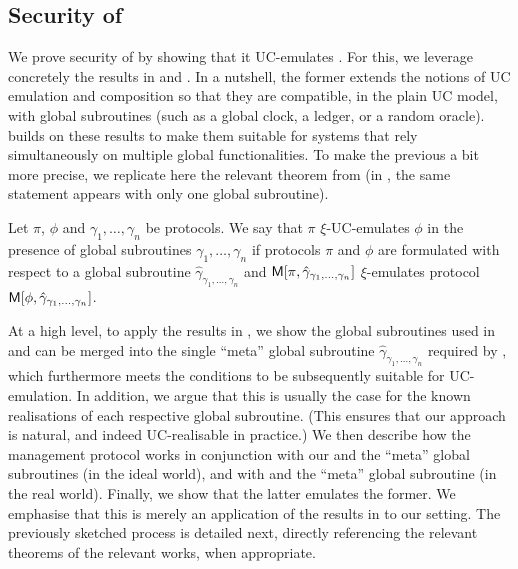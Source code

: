 \subsection{Security of \RealPKIDIDAtala}
\label{ssec:sec-didatala}

We prove security of \RealPKIDIDAtala by showing that it UC-emulates
\IdealGPKIDID. For this, we leverage concretely the results in \cite{bch+20} and
\cite{bhz21}. In a nutshell, the former extends the notions of UC emulation and
composition so that they are compatible, in the plain UC model, with global
subroutines (such as a global clock, a ledger, or a random oracle).
\cite{bhz21} builds on these results to make them suitable for systems that rely
simultaneously on multiple global functionalities.
%
To make the previous a bit more precise, we replicate here the relevant theorem
from \cite{bhz21} (in \cite{bch+20}, the same statement appears with only one
global subroutine).

\begin{theorem}
  \label{thm:uc-bhz21}
  Let $\pi$, $\phi$ and $\gamma_1,\dots,\gamma_n$ be protocols. We say that
  $\pi$ $\xi$-UC-emulates $\phi$ in the presence of global subroutines
  $\gamma_1,\dots,\gamma_n$ if protocols $\pi$ and $\phi$ are formulated with
  respect to a global subroutine $\hat{\gamma}_{\gamma_1,\dots,\gamma_n}$ and
  $\mathsf{M}[\pi,\hat{\gamma}_{\gamma_1,\dots,\gamma_n}]$ $\xi$-emulates protocol
  $\mathsf{M}[\phi,\hat{\gamma}_{\gamma_1,\dots,\gamma_n}]$.
\end{theorem}

At a high level, to apply the results in \cite{bch+20,bzh21}, we show the global
subroutines used in \IdealGPKIDID and \RealPKIDIDAtala can be merged into the
single ``meta'' global subroutine $\hat{\gamma}_{\gamma_1,\dots,\gamma_n}$
required by , which furthermore meets the conditions to be
subsequently suitable for UC-emulation. In addition, we argue that this is
usually the case for the known realisations of each respective global
subroutine. (This ensures that our approach is natural, and indeed UC-realisable
in practice.)
%
We then describe how the management protocol \UCM works in conjunction with
our \IdealGPKIDID and the ``meta'' global subroutines (in the ideal world), and
with \RealPKIDIDAtala and the ``meta'' global subroutine (in the real world).
%
Finally, we show that the latter emulates the former.
%
We emphasise that this is merely an application of the results in
\cite{bch+20,bhz21} to our setting. The previously sketched process is detailed
next, directly referencing the relevant theorems of the relevant works, when
appropriate.

